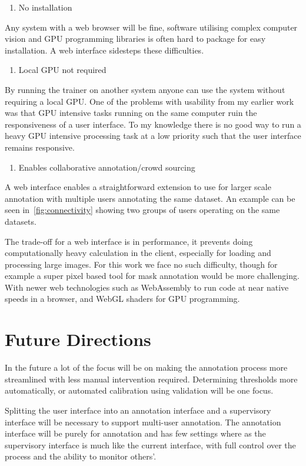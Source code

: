 \begin{enumerate}
    \item No installation
\end{enumerate}
Any system with a web browser will be fine, software utilising complex computer vision and GPU programming libraries is often hard to package for easy installation. A web interface sidesteps these difficulties.
\begin{enumerate}[resume]
    \item Local GPU not required
\end{enumerate}
By running the trainer on another system anyone can use the system without requiring a local GPU. One of the problems with usability from my earlier work was that GPU intensive tasks running on the same computer ruin the responsiveness of a user interface. To my knowledge there is no good way to run a heavy \gls{GPU} intensive processing task at a low priority such that the user interface remains responsive.
\begin{enumerate}[resume]
    \item Enables collaborative annotation/crowd sourcing
\end{enumerate}
A web interface enables a straightforward extension to use for larger scale annotation with multiple users annotating the same dataset. An example can be seen in~\ref{fig:connectivity} showing two groups of users operating on the same datasets.


The trade-off for a web interface is in performance, it prevents doing computationally heavy calculation in the client, especially for loading and processing large images. For this work we face no such difficulty, though for example a super pixel based tool for mask annotation would be more challenging. With newer web technologies such as WebAssembly \cite{Haas2017} to run code at near native speeds in a browser, and WebGL shaders for GPU programming.



\section{Future Directions}
\label{sec:design_future_direction}

In the future a lot of the focus will be on making the annotation process more streamlined with less manual intervention required. Determining thresholds more automatically, or automated calibration using validation will be one focus.

Splitting the user interface into an annotation interface and a supervisory interface will be necessary to support multi-user annotation. The annotation interface will be purely for annotation and has few settings where as the supervisory interface is much like the current interface, with full control over the process and the ability to monitor others'.

